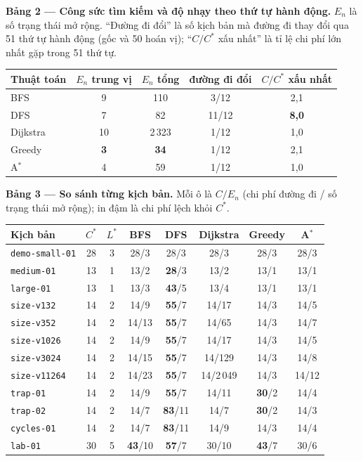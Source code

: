 \documentclass[11pt,a4paper]{article}
\newcommand{\Cs}{C^{*}}
\newcommand{\Ls}{L^{*}}
\begin{document}
\textbf{Bảng 2 --- Công sức tìm kiếm và độ nhạy theo thứ tự hành động.} $E_n$ là số trạng thái mở rộng. ``Đường đi đổi'' là số kịch bản mà đường đi thay đổi qua 51 thứ tự hành động (gốc và 50 hoán vị); ``$C/\Cs$ xấu nhất'' là tỉ lệ chi phí lớn nhất gặp trong 51 thứ tự.

\begin{center}\small
\begin{tabular}{@{}lcccc@{}}
\toprule
Thuật toán & $E_n$ trung vị & $E_n$ tổng & đường đi đổi & $C/\Cs$ xấu nhất \\
\midrule
BFS      & 9  & 110    & 3/12  & 2,1 \\
DFS      & 7  & 82     & 11/12 & \textbf{8,0} \\
Dijkstra & 10 & 2\,323 & 1/12  & 1,0 \\
Greedy   & \textbf{3} & \textbf{34} & 1/12 & 2,1 \\
A$^{*}$  & 4  & 59     & 1/12  & 1,0 \\
\bottomrule
\end{tabular}
\end{center}

\textbf{Bảng 3 --- So sánh từng kịch bản.} Mỗi ô là $C/E_n$ (chi phí đường đi / số trạng thái mở rộng); in đậm là chi phí lệch khỏi $\Cs$.

\begin{center}\footnotesize
\begin{tabular}{@{}lccccccc@{}}
\toprule
Kịch bản & $\Cs$ & $\Ls$ & BFS & DFS & Dijkstra & Greedy & A$^{*}$ \\
\midrule
\texttt{demo-small-01} & 28 & 3 & 28/3 & 28/3 & 28/3 & 28/3 & 28/3 \\
\texttt{medium-01}     & 13 & 1 & 13/2 & \textbf{28}/3 & 13/2 & 13/1 & 13/1 \\
\texttt{large-01}      & 13 & 1 & 13/3 & \textbf{43}/5 & 13/4 & 13/1 & 13/1 \\
\texttt{size-v132}     & 14 & 2 & 14/9 & \textbf{55}/7 & 14/17 & 14/3 & 14/5 \\
\texttt{size-v352}     & 14 & 2 & 14/13 & \textbf{55}/7 & 14/65 & 14/3 & 14/7 \\
\texttt{size-v1026}    & 14 & 2 & 14/9 & \textbf{55}/7 & 14/17 & 14/3 & 14/5 \\
\texttt{size-v3024}    & 14 & 2 & 14/15 & \textbf{55}/7 & 14/129 & 14/3 & 14/8 \\
\texttt{size-v11264}   & 14 & 2 & 14/23 & \textbf{55}/7 & 14/2\,049 & 14/3 & 14/12 \\
\texttt{trap-01}       & 14 & 2 & 14/9 & \textbf{55}/7 & 14/11 & \textbf{30}/2 & 14/4 \\
\texttt{trap-02}       & 14 & 2 & 14/7 & \textbf{83}/11 & 14/7 & \textbf{30}/2 & 14/3 \\
\texttt{cycles-01}     & 14 & 2 & 14/7 & \textbf{83}/11 & 14/9 & 14/3 & 14/4 \\
\texttt{lab-01}        & 30 & 5 & \textbf{43}/10 & \textbf{57}/7 & 30/10 & \textbf{43}/7 & 30/6 \\
\bottomrule
\end{tabular}
\end{center}
\end{document}
